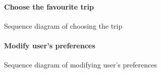 \documentclass[12pt,titlepage]{article}
\begin{document}
\begin{figure}
\paragraph{Choose the favourite trip}
\centering
{}
\caption{Sequence diagram of choosing the trip}
\end{figure}
\clearpage
\newpage

\begin{figure}
\paragraph{Modify user's preferences}
\centering
{}
\caption{Sequence diagram of modifying user's preferences}
\end{figure}

\clearpage
\newpage
\end{document}

